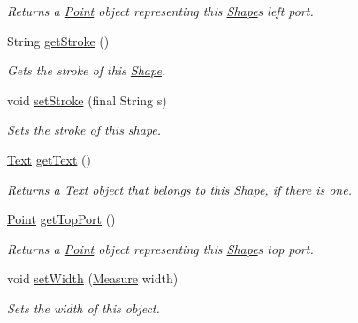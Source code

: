 \begin{DoxyCompactItemize}
\begin{DoxyCompactList}\small\item\em Returns a \hyperlink{classcom_1_1aarrelaakso_1_1drawl_1_1_point}{Point} object representing this \hyperlink{classcom_1_1aarrelaakso_1_1drawl_1_1_shape}{Shape}\textquotesingle{}s left port. \end{DoxyCompactList}\item 
String \hyperlink{classcom_1_1aarrelaakso_1_1drawl_1_1_shape_a4e1d54c7e161e3af5053939ddefdf9e6}{get\+Stroke} ()
\begin{DoxyCompactList}\small\item\em Gets the stroke of this \hyperlink{classcom_1_1aarrelaakso_1_1drawl_1_1_shape}{Shape}. \end{DoxyCompactList}\item 
void \hyperlink{classcom_1_1aarrelaakso_1_1drawl_1_1_shape_a75685cbfea36858836df8e1fb4f8b821}{set\+Stroke} (final String s)
\begin{DoxyCompactList}\small\item\em Sets the stroke of this shape. \end{DoxyCompactList}\item 
\hyperlink{classcom_1_1aarrelaakso_1_1drawl_1_1_text}{Text} \hyperlink{classcom_1_1aarrelaakso_1_1drawl_1_1_shape_a6f876978d4102974fedc5b41c93c7b26}{get\+Text} ()
\begin{DoxyCompactList}\small\item\em Returns a \hyperlink{classcom_1_1aarrelaakso_1_1drawl_1_1_text}{Text} object that belongs to this \hyperlink{classcom_1_1aarrelaakso_1_1drawl_1_1_shape}{Shape}, if there is one. \end{DoxyCompactList}\item 
\hyperlink{classcom_1_1aarrelaakso_1_1drawl_1_1_point}{Point} \hyperlink{classcom_1_1aarrelaakso_1_1drawl_1_1_shape_aed4e9caa294aacc973b7a531a960e9e5}{get\+Top\+Port} ()
\begin{DoxyCompactList}\small\item\em Returns a \hyperlink{classcom_1_1aarrelaakso_1_1drawl_1_1_point}{Point} object representing this \hyperlink{classcom_1_1aarrelaakso_1_1drawl_1_1_shape}{Shape}\textquotesingle{}s top port. \end{DoxyCompactList}\item 
void \hyperlink{classcom_1_1aarrelaakso_1_1drawl_1_1_shape_a8b5f19ff40445c0cf8cad2688d7df810}{set\+Width} (\hyperlink{classcom_1_1aarrelaakso_1_1drawl_1_1_measure}{Measure} width)
\begin{DoxyCompactList}\small\item\em Sets the width of this object. \end{DoxyCompactList}\item 

\end{DoxyCompactItemize}
